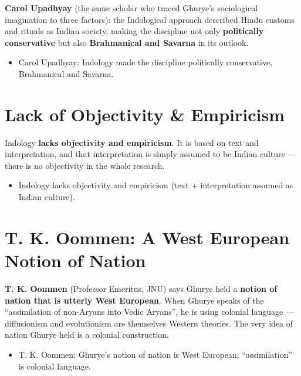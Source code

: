 \begin{CriticalPoint}
\textbf{Carol Upadhyay} (the same scholar who traced Ghurye's sociological imagination to three factors): the Indological approach described Hindu customs and rituals as Indian society, making the discipline not only \textbf{politically conservative} but also \textbf{Brahmanical and Savarna} in its outlook.
\end{CriticalPoint}

\begin{QuickRevision}
\begin{itemize}
\item Carol Upadhyay: Indology made the discipline politically conservative, Brahmanical and Savarna.
\end{itemize}
\end{QuickRevision}

\section{Lack of Objectivity \& Empiricism}

Indology \textbf{lacks objectivity and empiricism}. It is based on text and interpretation, and that interpretation is simply assumed to be Indian culture --- there is no objectivity in the whole research.

\begin{QuickRevision}
\begin{itemize}
\item Indology lacks objectivity and empiricism (text + interpretation assumed as Indian culture).
\end{itemize}
\end{QuickRevision}

\section{T. K. Oommen: A West European Notion of Nation}

\begin{CriticalPoint}
\textbf{T. K. Oommen} (Professor Emeritus, JNU) says Ghurye held a \textbf{notion of nation that is utterly West European}. When Ghurye speaks of the ``assimilation of non-Aryans into Vedic Aryans'', he is using colonial language --- diffusionism and evolutionism are themselves Western theories. The very idea of nation Ghurye held is a colonial construction.
\end{CriticalPoint}

\begin{QuickRevision}
\begin{itemize}
\item T. K. Oommen: Ghurye's notion of nation is West European; ``assimilation'' is colonial language.
\end{itemize}
\end{QuickRevision}

